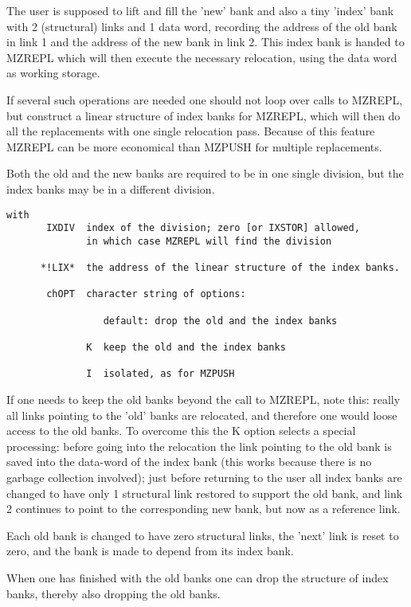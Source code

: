 The user is supposed to lift and fill the 'new' bank and also a
tiny 'index' bank with 2 (structural) links and 1 data word,
recording the address of the old bank in link 1 and the address
of the new bank in link 2.
This index bank is handed to MZREPL which will then execute
the necessary relocation, using the data word as working storage.

If several such operations are needed one should not loop
over calls to MZREPL, but construct a linear structure of
index banks for MZREPL, which will then do all the replacements
with one single relocation pass.
Because of this feature MZREPL can be more economical than
MZPUSH for multiple replacements.

Both the old and the new banks are required to be in one single
division, but the index banks may be in a different division.

\begin{verbatim}
with
       IXDIV  index of the division; zero [or IXSTOR] allowed,
              in which case MZREPL will find the division

      *!LIX*  the address of the linear structure of the index banks.

       chOPT  character string of options:

                 default: drop the old and the index banks

              K  keep the old and the index banks

              I  isolated, as for MZPUSH
\end{verbatim} 

If one needs to keep the old banks beyond the call to MZREPL,
note this: really all links pointing to the 'old' banks are
relocated, and therefore one would loose access to the old banks.
To overcome this the K option selects a special processing:
before going into the relocation the link pointing to the
old bank is saved into the data-word of the index bank
(this works because there is no garbage collection involved);
just before returning to the user all index banks are changed
to have only 1 structural link restored to support the old bank,
and link 2 continues to point to the corresponding new bank,
but now as a reference link.

Each old bank is changed to have zero structural links,
the 'next' link is reset to zero, and the bank is made to
depend from its index bank.

When one has finished with the old banks one can drop the
structure of index banks, thereby also dropping the old banks.

